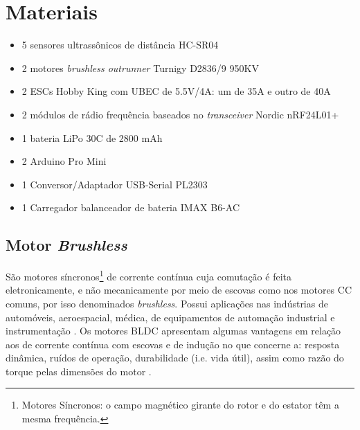 % 
% 
% 


\chapter{Materiais}
\begin{itemize} %
 \item 5 sensores ultrassônicos de distância HC-SR04
 \item 2 motores \textit{brushless outrunner} Turnigy D2836/9 950KV
 \item 2 ESCs Hobby King com UBEC de 5.5V/4A: um de 35A e outro de 40A 
 \item 2 módulos de rádio frequência baseados no \textit{transceiver} Nordic nRF24L01+ 
 \item 1 bateria LiPo 30C de 2800 mAh
 \item 2 Arduino Pro Mini
 \item 1 Conversor/Adaptador USB-Serial PL2303
 \item 1 Carregador balanceador de bateria IMAX B6-AC
\end{itemize}

\section{Motor \textit{Brushless}}
São motores síncronos\footnote{Motores Síncronos: o campo magnético girante do rotor e do estator têm a mesma frequência.} de corrente contínua cuja 
comutação é feita eletronicamente, e não mecanicamente por meio de escovas como nos motores CC comuns, por isso denominados \textit{brushless}.
Possui aplicações nas indústrias de automóveis, aeroespacial, médica, de equipamentos de automação industrial e instrumentação .
Os motores BLDC apresentam algumas vantagens em relação aos de corrente contínua com escovas e de indução no que concerne a: resposta 
dinâmica, ruídos 
de operação, durabilidade (i.e. vida útil), assim como razão do torque pelas dimensões do motor \cite{motor_2}. 

